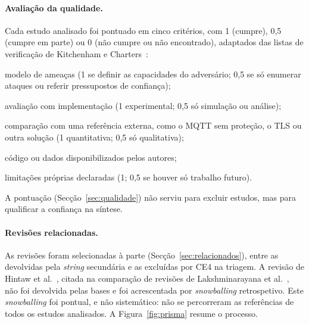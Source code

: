 \paragraph{Avaliação da qualidade.} Cada estudo analisado foi pontuado em cinco
critérios, com 1 (cumpre), 0,5 (cumpre em parte) ou 0 (não cumpre ou não
encontrado), adaptados das listas de verificação de Kitchenham e
Charters~\cite{kitchenham2007}:
\begin{enumerate*}[label=\textbf{QA\arabic*}~]
  \item modelo de ameaças (1 se definir as capacidades do adversário; 0,5 se só
    enumerar ataques ou referir pressupostos de confiança);
  \item avaliação com implementação (1 experimental; 0,5 só simulação ou
    análise);
  \item comparação com uma referência externa, como o MQTT sem proteção, o TLS ou
    outra solução (1 quantitativa; 0,5 só qualitativa);
  \item código ou dados disponibilizados pelos autores;
  \item limitações próprias declaradas (1; 0,5 se houver só trabalho futuro).
\end{enumerate*}
A pontuação (Secção~\ref{sec:qualidade}) não serviu para excluir estudos, mas para
qualificar a confiança na síntese.

\paragraph{Revisões relacionadas.} As revisões foram selecionadas à parte
(Secção~\ref{sec:relacionados}), entre as devolvidas pela \emph{string} secundária e
as excluídas por CE4 na triagem. A revisão de Hintaw et al.~\cite{hintaw2023mqtt},
citada na comparação de revisões de Lakshminarayana et
al.~\cite[§I]{lakshminarayana2024securing}, não foi devolvida pelas bases e foi
acrescentada por \emph{snowballing} retrospetivo. Este \emph{snowballing} foi
pontual, e não sistemático: não se percorreram as referências de todos os estudos
analisados.
A Figura~\ref{fig:prisma} resume o processo.

